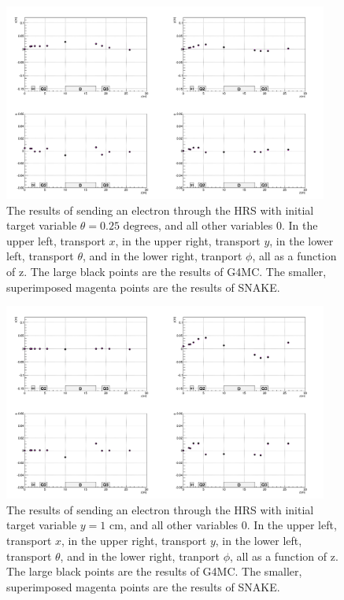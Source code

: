 \documentclass[11pt]{amsart}
\begin{document}
\begin{figure}
\begin{center}
\includegraphics[width=0.95\textwidth]{plots/pres_matrix_t_4.png}
\end{center}
\caption{The results of sending an electron through the HRS with initial target variable $\theta=0.25\text{ degrees}$, and all other variables 0. In the upper left, transport $x$, in the upper right, transport $y$, in the lower left, transport $\theta$, and in the lower right, tranport $\phi$, all as a function of z. The large black points are the results of G4MC. The smaller, superimposed magenta points are the results of SNAKE.}
\end{figure}

\begin{figure}
\begin{center}
\includegraphics[width=0.95\textwidth]{plots/pres_matrix_y_4.png}
\end{center}
\caption{The results of sending an electron through the HRS with initial target variable $y=1\text{ cm}$, and all other variables 0. In the upper left, transport $x$, in the upper right, transport $y$, in the lower left, transport $\theta$, and in the lower right, tranport $\phi$, all as a function of z. The large black points are the results of G4MC. The smaller, superimposed magenta points are the results of SNAKE.}
\end{figure}
\end{document}
